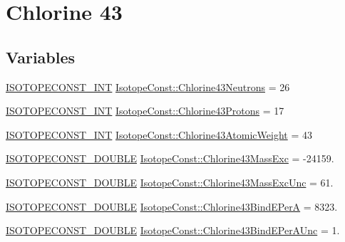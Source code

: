 \hypertarget{group___isotope_const-_chlorine-_cl43}{}\section{Chlorine 43}
\label{group___isotope_const-_chlorine-_cl43}
\subsection*{Variables}
\begin{DoxyCompactItemize}
\item 
\mbox{\hyperlink{group___isotope_const-_macros_ga5f18360b3e99483a35c32d789e62621c}{I\+S\+O\+T\+O\+P\+E\+C\+O\+N\+S\+T\+\_\+\+I\+NT}} \mbox{\hyperlink{group___isotope_const-_chlorine-_cl43_ga97cf617208d91ad6d1b2f2dc2ff87dcb}{Isotope\+Const\+::\+Chlorine43\+Neutrons}} = 26
\item 
\mbox{\hyperlink{group___isotope_const-_macros_ga5f18360b3e99483a35c32d789e62621c}{I\+S\+O\+T\+O\+P\+E\+C\+O\+N\+S\+T\+\_\+\+I\+NT}} \mbox{\hyperlink{group___isotope_const-_chlorine-_cl43_ga8c90bdfdfa417f64814a2c20c4a1feb3}{Isotope\+Const\+::\+Chlorine43\+Protons}} = 17
\item 
\mbox{\hyperlink{group___isotope_const-_macros_ga5f18360b3e99483a35c32d789e62621c}{I\+S\+O\+T\+O\+P\+E\+C\+O\+N\+S\+T\+\_\+\+I\+NT}} \mbox{\hyperlink{group___isotope_const-_chlorine-_cl43_gaf711f307d1993b5a591ec2cfd39fa6dc}{Isotope\+Const\+::\+Chlorine43\+Atomic\+Weight}} = 43
\item 
\mbox{\hyperlink{group___isotope_const-_macros_ga8f45a7272ce02c0b4c65c44636ed719a}{I\+S\+O\+T\+O\+P\+E\+C\+O\+N\+S\+T\+\_\+\+D\+O\+U\+B\+LE}} \mbox{\hyperlink{group___isotope_const-_chlorine-_cl43_gad923d4e49569bc24cfe1c2ff7f8d957f}{Isotope\+Const\+::\+Chlorine43\+Mass\+Exc}} = -\/24159.
\item 
\mbox{\hyperlink{group___isotope_const-_macros_ga8f45a7272ce02c0b4c65c44636ed719a}{I\+S\+O\+T\+O\+P\+E\+C\+O\+N\+S\+T\+\_\+\+D\+O\+U\+B\+LE}} \mbox{\hyperlink{group___isotope_const-_chlorine-_cl43_ga792e7ca865d8d68407bad01c6eebbae6}{Isotope\+Const\+::\+Chlorine43\+Mass\+Exc\+Unc}} = 61.
\item 
\mbox{\hyperlink{group___isotope_const-_macros_ga8f45a7272ce02c0b4c65c44636ed719a}{I\+S\+O\+T\+O\+P\+E\+C\+O\+N\+S\+T\+\_\+\+D\+O\+U\+B\+LE}} \mbox{\hyperlink{group___isotope_const-_chlorine-_cl43_ga23e8d1fa29552efb20b063ef70294b4a}{Isotope\+Const\+::\+Chlorine43\+Bind\+E\+PerA}} = 8323.
\item 
\mbox{\hyperlink{group___isotope_const-_macros_ga8f45a7272ce02c0b4c65c44636ed719a}{I\+S\+O\+T\+O\+P\+E\+C\+O\+N\+S\+T\+\_\+\+D\+O\+U\+B\+LE}} \mbox{\hyperlink{group___isotope_const-_chlorine-_cl43_gabaab9292ea57638a1fcc2545d0ba55de}{Isotope\+Const\+::\+Chlorine43\+Bind\+E\+Per\+A\+Unc}} = 1.

\end{DoxyCompactItemize}
